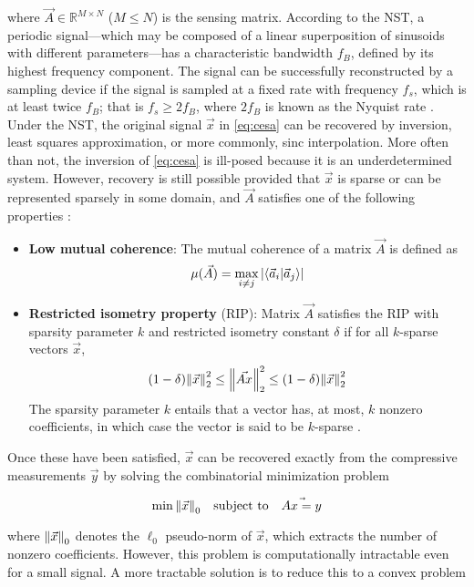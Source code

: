 \noindent where $\vec{A} \in \mathbb{R}^{M \times N}$ ($M \leq N$) is the sensing matrix. According to the NST, a periodic signal---which may be composed of a linear superposition of sinusoids with different parameters---has a characteristic bandwidth $f_B$, defined by its highest frequency component. The signal can be successfully reconstructed by a sampling device if the signal is sampled at a fixed rate with frequency $f_s$, which is at least twice $f_B$; that is $f_s \geq 2f_B$, where $2f_B$ is known as the Nyquist rate \cite{Shannon1949}. Under the NST, the original signal $\vec{x}$ in \eqref{eq:cesa} can be recovered by inversion, least squares approximation, or more commonly, sinc interpolation. More often than not, the inversion of \eqref{eq:cesa} is ill-posed because it is an underdetermined system. However, recovery is still possible provided that $\vec{x}$ is sparse or can be represented sparsely in some domain, and $\vec{A}$ satisfies one of the following properties \cite{Mazumdar2015}:
\begin{itemize}
	\item \textbf{Low mutual coherence}: The mutual coherence of a matrix $\vec{A}$ is defined as
	\begin{equation}
		\mu(\vec{A}) = \max_{i \neq j} \abs{\innerproduct{\vec{a}_i}{\vec{a}_j}}
	\end{equation}
	\item \textbf{Restricted isometry property} (RIP): Matrix $\vec{A}$ satisfies the RIP with sparsity parameter $k$ and restricted isometry constant $\delta$ if for all $k$-sparse vectors $\vec{x}$,
	\begin{equation}
		\qty(1 - \delta)\norm{\vec{x}}_2^2 \leq \norm{\vec{Ax}}_2^2 \leq \qty(1 - \delta)\norm{\vec{x}}_2^2
	\end{equation}
	\noindent The sparsity parameter $k$ entails that a vector has, at most, $k$ nonzero coefficients, in which case the vector is said to be $k$-sparse \cite{Candes2006}.
\end{itemize}

\noindent Once these have been satisfied, $\vec{x}$ can be recovered exactly from the compressive measurements $\vec{y}$ by solving the combinatorial minimization problem

\begin{equation}\label{eq:min-l0}
	\min \norm{\vec{x}}_0 \quad \textrm{subject to} \quad \vec{Ax = y}
\end{equation}

\noindent where $\norm{\vec{x}}_0$ denotes the $\ell_0$ pseudo-norm of $\vec{x}$, which extracts the number of nonzero coefficients. However, this problem is computationally intractable even for a small signal. A more tractable solution is to reduce this to a convex problem


